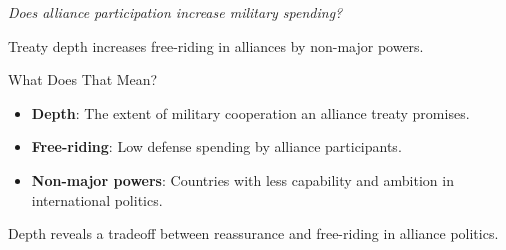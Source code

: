 \documentclass[12pt]{beamer}
\begin{document}

\begin{frame}[standout]

\huge \textit{Does alliance participation increase military spending?} 

\end{frame}

 \begin{frame}[standout]

Treaty depth increases free-riding in alliances by non-major powers.  

 \end{frame}
 
 
 \begin{frame}{What Does That Mean?} 

\begin{itemize}
\item \textbf{Depth}: The extent of military cooperation an alliance treaty promises.
\pause  
\item \textbf{Free-riding}: Low defense spending by alliance participants. 
\pause 
\item \textbf{Non-major powers}: Countries with less capability and ambition in international politics. 
\end{itemize}

 \end{frame}
 
 
 \begin{frame}[standout]

Depth reveals a tradeoff between reassurance and free-riding in alliance politics. 

 \end{frame}
 
 
\end{document}
